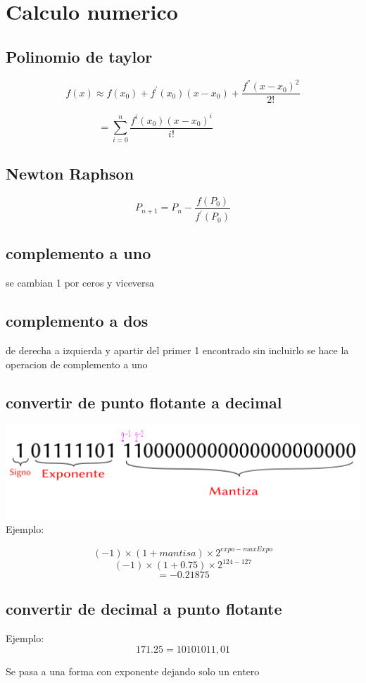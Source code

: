 \newpage
\section{Calculo numerico}
\subsection{Polinomio de taylor}
$$f(x) \approx f(x_0) + f^{'}(x_0)(x-x_0) + \frac{f^{''}(x-x_0)^2}{2!}$$

$$= \sum\limits_{i=0}^{n} \frac{f^{i}(x_0)(x-x_0)^i } {i!} \;\;\;\;\;\;\;\;\;\;\;\;\;\;\;\;\;\;\;\;$$
\subsection{Newton Raphson}
$$ P_{n+1} = P_n - \frac{f(P_0)}{f^{'}(P_0)} $$

\subsection{complemento a uno}
se cambian 1 por ceros y viceversa
\subsection{complemento a dos}
de derecha a izquierda y apartir del primer 1 encontrado sin incluirlo se 
hace la operacion de complemento a uno
\subsection{convertir de punto flotante a decimal}
\includegraphics[scale = 0.5]{1.png}
Ejemplo:

$$(-1) \times (1+mantisa) \times {2^{expo - maxExpo} } $$
$$(-1) \times (1+0.75) \times 2^{124-127} $$
$$ = -0.21875$$

\subsection{convertir de decimal a punto flotante}
Ejemplo:
$$171.25 = 10101011,01$$

Se pasa a una forma con exponente dejando solo un entero

